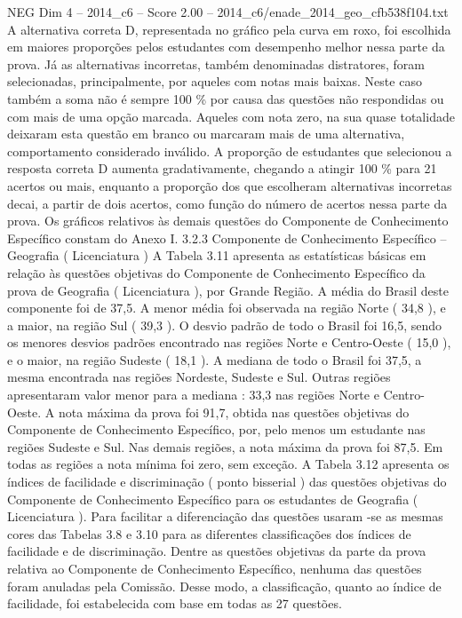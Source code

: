\begin{textsample}{NEG Dim 4 – 2014\_c6 – Score 2.00 – 2014\_c6/enade\_2014\_geo\_cfb538f104.txt}
A alternativa correta D, representada no gráfico pela curva em roxo, foi escolhida em maiores proporções pelos estudantes com desempenho melhor nessa parte da prova.
Já as alternativas incorretas, também denominadas distratores, foram selecionadas, principalmente, por aqueles com notas mais baixas.
Neste caso também a soma não é sempre 100 \% por causa das questões não respondidas ou com mais de uma opção marcada.
Aqueles com nota zero, na sua quase totalidade deixaram esta questão em branco ou marcaram mais de uma alternativa, comportamento considerado inválido.
A proporção de estudantes que selecionou a resposta correta D aumenta gradativamente, chegando a atingir 100 \% para 21 acertos ou mais, enquanto a proporção dos que escolheram alternativas incorretas decai, a partir de dois acertos, como função do número de acertos nessa parte da prova.
Os gráficos relativos às demais questões do Componente de Conhecimento Específico constam do Anexo I. 3.2.3 Componente de Conhecimento Específico – Geografia ( Licenciatura ) A Tabela 3.11 apresenta as estatísticas básicas em relação às questões objetivas do Componente de Conhecimento Específico da prova de Geografia ( Licenciatura ), por Grande Região.
A média do Brasil deste componente foi de 37,5.
A menor média foi observada na região Norte ( 34,8 ), e a maior, na região Sul ( 39,3 ).
O desvio padrão de todo o Brasil foi 16,5, sendo os menores desvios padrões encontrado nas regiões Norte e Centro-Oeste ( 15,0 ), e o maior, na região Sudeste ( 18,1 ).
A mediana de todo o Brasil foi 37,5, a mesma encontrada nas regiões Nordeste, Sudeste e Sul.
Outras regiões apresentaram valor menor para a mediana : 33,3 nas regiões Norte e Centro-Oeste.
A nota máxima da prova foi 91,7, obtida nas questões objetivas do Componente de Conhecimento Específico, por, pelo menos um estudante nas regiões Sudeste e Sul.
Nas demais regiões, a nota máxima da prova foi 87,5.
Em todas as regiões a nota mínima foi zero, sem exceção.
A Tabela 3.12 apresenta os índices de facilidade e discriminação ( ponto bisserial ) das questões objetivas do Componente de Conhecimento Específico para os estudantes de Geografia ( Licenciatura ).
Para facilitar a diferenciação das questões usaram -se as mesmas cores das Tabelas 3.8 e 3.10 para as diferentes classificações dos índices de facilidade e de discriminação.
Dentre as questões objetivas da parte da prova relativa ao Componente de Conhecimento Específico, nenhuma das questões foram anuladas pela Comissão.
Desse modo, a classificação, quanto ao índice de facilidade, foi estabelecida com base em todas as 27 questões.

\end{textsample}
